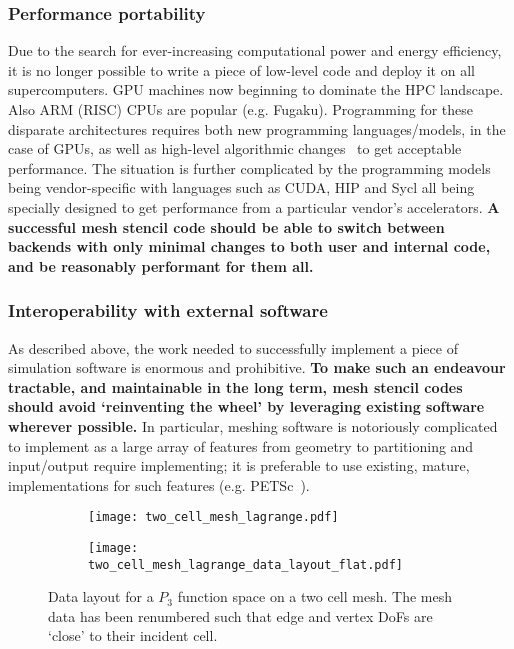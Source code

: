 \documentclass[thesis]{subfiles}
\begin{document}
\subsubsection{Performance portability}

Due to the search for ever-increasing computational power and energy efficiency, it is no longer possible to write a piece of low-level code and deploy it on all supercomputers.
GPU machines now beginning to dominate the HPC landscape.
Also ARM (RISC) CPUs are popular (e.g. Fugaku).
Programming for these disparate architectures requires both new programming languages/models, in the case of GPUs, as well as high-level algorithmic changes~\cite{betteridgeCodeGenerationProductive2021} to get acceptable performance.
The situation is further complicated by the programming models being vendor-specific with languages such as CUDA, HIP and Sycl all being specially designed to get performance from a particular vendor's accelerators.
\textbf{A successful mesh stencil code should be able to switch between backends with only minimal changes to both user and internal code, and be reasonably performant for them all.}


\subsubsection{Interoperability with external software}

As described above, the work needed to successfully implement a piece of simulation software is enormous and prohibitive.
\textbf{To make such an endeavour tractable, and maintainable in the long term, mesh stencil codes should avoid `reinventing the wheel' by leveraging existing software wherever possible.}
In particular, meshing software is notoriously complicated to implement as a large array of features from geometry to partitioning and input/output require implementing; it is preferable to use existing, mature, implementations for such features (e.g. PETSc~\cite{petsc-user-ref,petsc-web-page,petsc-efficient}).

\begin{figure}
  \centering
  \begin{subfigure}{\textwidth}
    \centering
    \texttt{[image: two\_cell\_mesh\_lagrange.pdf]}
    \vspace{1em}
  \end{subfigure}
  \begin{subfigure}{\textwidth}
    \centering
    \texttt{[image: two\_cell\_mesh\_lagrange\_data\_layout\_flat.pdf]}
  \end{subfigure}
  \caption{
    Data layout for a $P_3$ function space on a two cell mesh.
    The mesh data has been renumbered such that edge and vertex DoFs are `close' to their incident cell.
  }
  \label{fig:mesh_renumbering_demo}
\end{figure}
\end{document}
